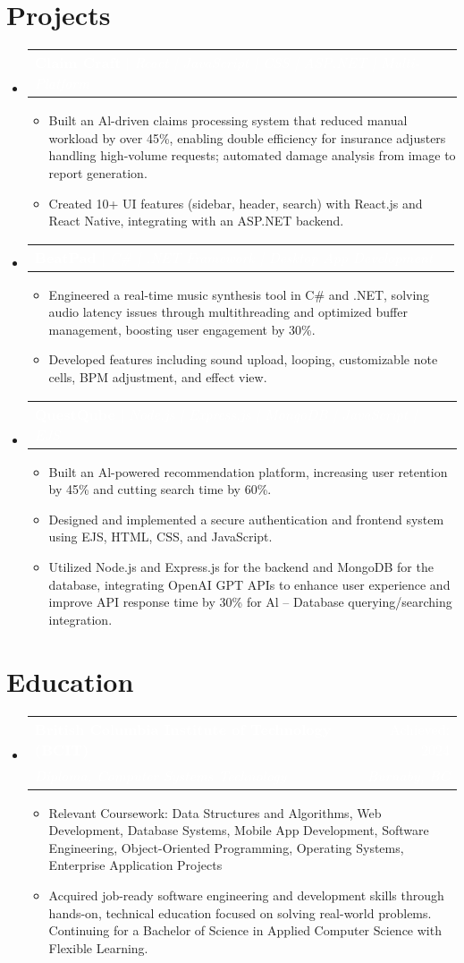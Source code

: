 \documentclass[letterpaper,11pt]{article}
\makeatletter
\newcommand{\resumeItem}[1]{
\item\small{
{#1 \vspace{-2pt}}
}
}
\newcommand{\resumeSubheading}[4]{
\vspace{-2pt}\item
\begin{tabular*}{0.97\textwidth}[t]{l@{\extracolsep{\fill}}r}
\textbf{\textcolor{white}{#1}} & \textcolor{white}{#2} \\
\textit{\small\textcolor{white}{#3}} & \textit{\small \textcolor{white}{#4}} \\
\end{tabular*}\vspace{-7pt}
}
\newcommand{\resumeProjectHeading}[2]{
\item
\begin{tabular*}{0.97\textwidth}{l@{\extracolsep{\fill}}r}
\small\textcolor{white}{#1} & \textcolor{white}{#2} \\
\end{tabular*}\vspace{-7pt}
}
\newcommand{\resumeSubHeadingListStart}{\begin{itemize}[leftmargin=0.15in, label={}]}
\newcommand{\resumeSubHeadingListEnd}{\end{itemize}}
\newcommand{\resumeItemListStart}{\begin{itemize}}
\newcommand{\resumeItemListEnd}{\end{itemize}\vspace{-5pt}}
\makeatother
\begin{document}
\section{Projects}
\resumeSubHeadingListStart
\resumeProjectHeading{\textbf{Claim Craft} $|$ \emph{React | JavaScript | CSS | ASP.NET | Multi-Platform}}{}
\resumeItemListStart
\resumeItem{Built an Al-driven claims processing system that reduced manual workload by over 45\%, enabling double efficiency for
insurance adjusters handling high-volume requests; automated damage analysis from image to report generation.}
\resumeItem{Created 10+ UI features (sidebar, header, search) with React.js and React Native, integrating with an ASP.NET backend.}
\resumeItemListEnd

\resumeProjectHeading{\textbf{BeatPad} $|$ \emph{C\# | .NET Framework | Desktop App Development}}{}
\resumeItemListStart
\resumeItem{Engineered a real-time music synthesis tool in C\# and .NET, solving audio latency issues through multithreading and
optimized buffer management, boosting user engagement by 30\%.}
\resumeItem{Developed features including sound upload, looping, customizable note cells, BPM adjustment, and effect view.}
\resumeItemListEnd

\resumeProjectHeading{\textbf{QuestQube} $|$ \emph{Node.js | Express.js | MongoDB | JavaScript | EJS}}{}
\resumeItemListStart
\resumeItem{Built an Al-powered recommendation platform, increasing user retention by 45\% and cutting search time by 60\%.}
\resumeItem{Designed and implemented a secure authentication and frontend system using EJS, HTML, CSS, and JavaScript.}
\resumeItem{Utilized Node.js and Express.js for the backend and MongoDB for the database, integrating OpenAI GPT APIs to enhance
user experience and improve API response time by 30\% for Al – Database querying/searching integration.}
\resumeItemListEnd
\resumeSubHeadingListEnd

\section{Education}
\resumeSubHeadingListStart
\resumeSubheading{British Columbia Institute of Technology (BCIT)}{Achieved: 2024}{Diploma, Computer Systems Technology}{Burnaby, BC}
\resumeItemListStart
\resumeItem{Relevant Coursework: Data Structures and Algorithms, Web Development, Database Systems, Mobile App Development,
Software Engineering, Object-Oriented Programming, Operating Systems, Enterprise Application Projects}
\resumeItem{Acquired job-ready software engineering and development skills through hands-on, technical education focused on
solving real-world problems. Continuing for a Bachelor of Science in Applied Computer Science with Flexible Learning.}
\resumeItemListEnd
\resumeSubHeadingListEnd
\end{document}
